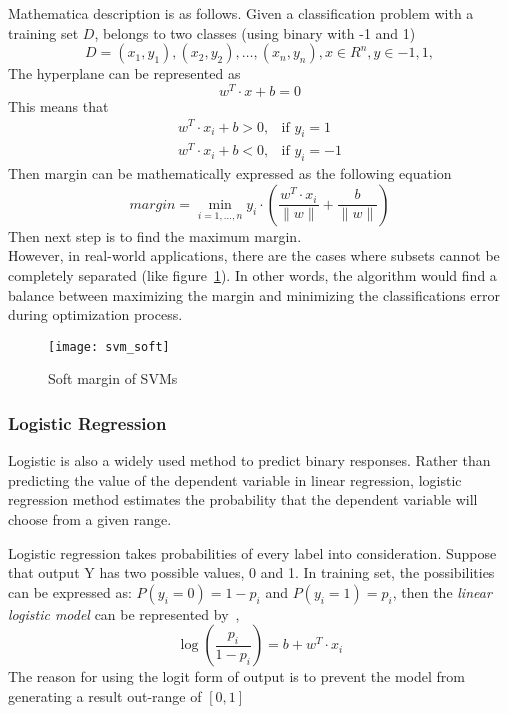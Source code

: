Mathematica description is as follows. Given a classification problem with a training set $ D $, belongs to two classes (using binary with -1 and 1)
\begin{equation}
D={(x_1,y_1),(x_2,y_2),\dots,(x_n,y_n)},x\in R^n, y\in{-1, 1},
\end{equation}
The hyperplane can be represented as
\begin{equation}
w^T \cdot x+b=0
\end{equation}
This means that
\begin{align*}
w^T\cdot x_i+b>0,& \text{if $y_i = 1$}\\
w^T\cdot x_i+b<0,& \text{if $y_i = -1$}
\end{align*}
Then margin can be mathematically expressed as the following equation\cite{6_tan_steinbach_kumar_2005}
\begin{equation}
margin=\min_{i=1,\dots,n}y_i\cdot(\frac{w^T\cdot x_i}{\lVert w\rVert} +\frac{b}{\lVert w\rVert})
\end{equation}
Then next step is to find the maximum margin.\\


However, in real-world applications, there are the cases where subsets cannot be completely separated (like figure~\ref{fg:SVM_soft})\cite{4_kantardzic}. In other words, the algorithm would find a balance between maximizing the margin and minimizing the classifications error during optimization process.
\begin{figure}[h]
	\centering
	\texttt{[image: svm\_soft]}
	\caption{Soft margin of SVMs}
	\label{fg:SVM_soft}
\end{figure}

\subsubsection{Logistic Regression}
Logistic is also a widely used method to predict binary responses. Rather than predicting the value of the dependent variable in linear regression, logistic regression method estimates the probability that the dependent variable will choose from a given range\cite{4_kantardzic}.

 
Logistic regression takes probabilities of every label into consideration. Suppose that output Y has two possible values, 0 and 1. In training set, the possibilities can be expressed as: $ P(y_i=0)=1-p_i $ and $ P(y_i=1)=p_i $, then the \textit{linear logistic model} can be represented by~\cite{4_kantardzic},
\begin{equation}
	\log (\frac{p_i}{1-p_i}) = b + w^T \cdot x_i
\end{equation}
The reason for using the logit form of output is to prevent the model from generating a result out-range of $ [0, 1] $\\


